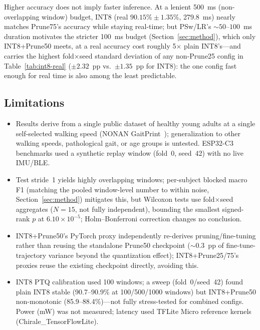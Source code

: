 \documentclass[conference]{IEEEtran}
\begin{document}
Higher accuracy does not imply faster inference. At a lenient 500~ms (non-overlapping window)
budget, INT8 (real $90.15\%\pm1.35\%$, 279.8~ms) nearly matches Prune75's accuracy while staying
real-time; but PSw/LR's ${\sim}50$--$100$~ms duration motivates the stricter 100~ms budget
(Section~\ref{sec:method}), which only INT8+Prune50 meets, at a real accuracy cost roughly
5$\times$ plain INT8's---and carries the highest fold$\times$seed standard deviation of any
non-Prune25 config in Table~\ref{tab:int8-real} ($\pm2.32$~pp vs.\ $\pm1.35$~pp for INT8): the one
config fast enough for real time is also among the least predictable.

\subsection{Limitations}
\label{sec:limitations}

\begin{itemize}
  \item Results derive from a single public dataset of healthy young adults at a single self-selected
        walking speed (NONAN GaitPrint~\cite{ref7}); generalization to other walking speeds,
        pathological gait, or age groups is untested. ESP32-C3 benchmarks used a synthetic replay
        window (fold~0, seed~42) with no live IMU/BLE.
  \item Test stride~1 yields highly overlapping windows; per-subject blocked macro F1 (matching
        the pooled window-level number to within noise, Section~\ref{sec:method}) mitigates this,
        but Wilcoxon tests use fold$\times$seed aggregates ($N{=}15$, not fully independent),
        bounding the smallest signed-rank $p$ at $6.10\times10^{-5}$; Holm--Bonferroni correction
        changes no conclusion.
  \item INT8+Prune50's PyTorch proxy independently re-derives pruning/fine-tuning rather than
        reusing the standalone Prune50 checkpoint (${\sim}0.3$~pp of fine-tune-trajectory variance
        beyond the quantization effect); INT8+Prune25/75's proxies reuse the existing checkpoint
        directly, avoiding this.
  \item INT8 PTQ calibration used 100 windows; a sweep (fold~0/seed~42) found plain INT8 stable
        (90.7--90.9\% at 100/500/1000 windows) but INT8+Prune50 non-monotonic (85.9--88.4\%)---not
        fully stress-tested for combined configs. Power (mW) was not measured; latency used TFLite
        Micro reference kernels (Chirale\_TensorFlowLite).
\end{itemize}
\end{document}
